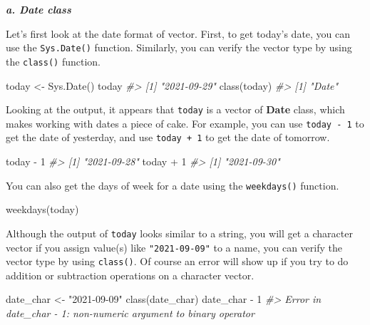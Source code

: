 \documentclass[
]{book}
\newenvironment{Shaded}{\begin{snugshade}}{\end{snugshade}}
\newcommand{\CommentTok}[1]{\textcolor[rgb]{0.56,0.35,0.01}{\textit{#1}}}
\newcommand{\DecValTok}[1]{\textcolor[rgb]{0.00,0.00,0.81}{#1}}
\newcommand{\FunctionTok}[1]{\textcolor[rgb]{0.00,0.00,0.00}{#1}}
\newcommand{\NormalTok}[1]{#1}
\newcommand{\OtherTok}[1]{\textcolor[rgb]{0.56,0.35,0.01}{#1}}
\newcommand{\SpecialCharTok}[1]{\textcolor[rgb]{0.00,0.00,0.00}{#1}}
\newcommand{\StringTok}[1]{\textcolor[rgb]{0.31,0.60,0.02}{#1}}
\newenvironment{blackbox}{
  \definecolor{shadecolor}{rgb}{0, 0, 0}  %
  \color{white}
  \begin{shaded}}
 {\end{shaded}}
\newenvironment{infobox}[1]
  {
  \begin{itemize}
  \renewcommand{\labelitemi}{
    \raisebox{-.7\height}[0pt][0pt]{
      {\setkeys{Gin}{width=3em,keepaspectratio}
        \texttt{[image: pics/\#1]}}
    }
  }
  \setlength{\fboxsep}{1em}
  \begin{blackbox}
  \item
  }
  {
  \end{blackbox}
  \end{itemize}
  }
\begin{document}
\textbf{\emph{a. Date class}}

Let's first look at the date format of vector. First, to get today's date, you can use the \texttt{Sys.Date()} function. Similarly, you can verify the vector type by using the \texttt{class()} function.

\begin{Shaded}
\begin{Highlighting}[]
\NormalTok{today }\OtherTok{\textless{}{-}} \FunctionTok{Sys.Date}\NormalTok{()}
\NormalTok{today}
\CommentTok{\#\textgreater{} [1] "2021{-}09{-}29"}
\FunctionTok{class}\NormalTok{(today)}
\CommentTok{\#\textgreater{} [1] "Date"}
\end{Highlighting}
\end{Shaded}

Looking at the output, it appears that \texttt{today} is a vector of \textbf{Date} class, which makes working with dates a piece of cake. For example, you can use \texttt{today\ -\ 1} to get the date of yesterday, and use \texttt{today\ +\ 1} to get the date of tomorrow.

\begin{Shaded}
\begin{Highlighting}[]
\NormalTok{today }\SpecialCharTok{{-}} \DecValTok{1}
\CommentTok{\#\textgreater{} [1] "2021{-}09{-}28"}
\NormalTok{today }\SpecialCharTok{+} \DecValTok{1}
\CommentTok{\#\textgreater{} [1] "2021{-}09{-}30"}
\end{Highlighting}
\end{Shaded}

You can also get the days of week for a date using the \texttt{weekdays()} function.

\begin{Shaded}
\begin{Highlighting}[]
\FunctionTok{weekdays}\NormalTok{(today)}
\end{Highlighting}
\end{Shaded}

\begin{infobox}{caution}

Although the output of \texttt{today} looks similar to a string, you will get a character vector if you assign value(s) like \texttt{"2021-09-09"} to a name, you can verify the vector type by using \texttt{class()}.
Of course an error will show up if you try to do addition or subtraction operations on a character vector.

\begin{Shaded}
\begin{Highlighting}[]
\NormalTok{date\_char }\OtherTok{\textless{}{-}} \StringTok{"2021{-}09{-}09"}
\FunctionTok{class}\NormalTok{(date\_char)}
\NormalTok{date\_char }\SpecialCharTok{{-}} \DecValTok{1}
\CommentTok{\#\textgreater{} Error in date\_char {-} 1: non{-}numeric argument to binary operator}
\end{Highlighting}
\end{Shaded}

\end{infobox}
\end{document}
